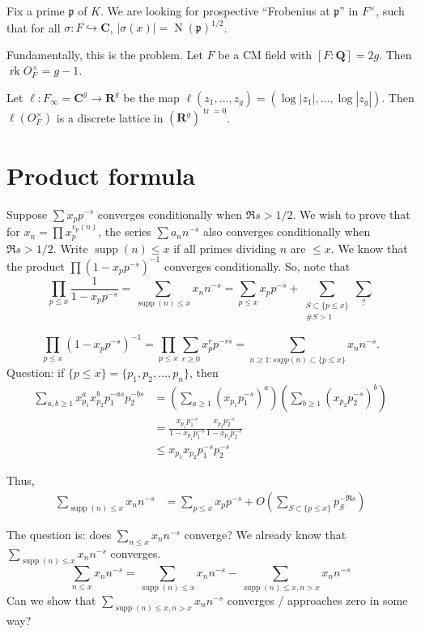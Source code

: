 \documentclass{article}
\DeclareMathOperator{\N}{N}
\DeclareMathOperator{\rk}{rk}
\DeclareMathOperator{\supp}{supp}
\DeclareMathOperator{\tr}{tr}
\newcommand{\bC}{\mathbf{C}}
\newcommand{\bQ}{\mathbf{Q}}
\newcommand{\bR}{\mathbf{R}}
\newcommand{\fp}{\mathfrak{p}}
\begin{document}
Fix a prime $\fp$ of $K$. We are looking for prospective ``Frobenius at $\fp$'' 
in $F^\times$, such that for all $\sigma\colon F\hookrightarrow\bC$, 
$|\sigma(x)| = \N(\fp)^{1/2}$. 

Fundamentally, this is the problem. Let $F$ be a CM field with 
$[F:\bQ] = 2 g$. Then $\rk O_F^\times = g - 1$. 


Let $\ell\colon F_\infty = \bC^g \to \bR^g$ be the map 
$\ell(z_1,\dots,z_g) = (\log |z_1|,\dots,\log |z_g|)$. Then 
$\ell(O_F^\times)$ is a discrete lattice in $(\bR^g)^{\tr = 0}$. 





\section{Product formula}

Suppose $\sum x_p p^{-s}$ converges conditionally when $\Re s > 1/2$. We wish 
to prove that for $x_n = \prod x_p^{v_p(n)}$, the series $\sum a_n n^{-s}$ also 
converges conditionally when $\Re s>1/2$. Write $\supp(n)\leqslant x$ if all 
primes dividing $n$ are $\leqslant x$. We know that the product 
$\prod (1 - x_p p^{-s})^{-1}$ converges conditionally. So, note that 
\[
	\prod_{p\leqslant x} \frac{1}{1 - x_p p^{-s}} = \sum_{\supp(n)\leqslant x} x_n n^{-s} = \sum_{p\leqslant x} x_p p^{-s} + \sum_{\substack{S\subset \{p\leqslant x\} \\ \# S > 1}} \sum_?
\]

\[
	\prod_{p\leqslant x} (1 - x_p p^{-s})^{-1} = \prod_{p\leqslant x} \sum_{r\geqslant 0} x_p^r p^{-r s} = \sum_{n\geqslant 1 : supp(n) \subset \{p\leqslant x\}} x_n n^{-s} .
\]
Question: if $\{p\leqslant x\} = \{p_1,p_2,\dots,p_n\}$, then 
\begin{align*}
	\sum_{a,b\geqslant 1} x_{p_1}^a x_{p_2}^b p_1^{-a s} p_2^{-b s} 
		&= \left(\sum_{a\geqslant 1} (x_{p_1} p_1^{-s})^a\right)\left(\sum_{b\geqslant 1} (x_{p_2} p_2^{-s})^b\right) \\
		&= \frac{x_{p_1} p_1^{-s}}{1 - x_{p_1} p_1^{-s}} \frac{x_{p_2} p_2^{-s}}{1 - x_{p_2} p_2^{-s}} \\
		&\leqslant x_{p_1} x_{p_2} p_1^{-s} p_2^{-s}
\end{align*}

Thus, 
\begin{align*}
	\sum_{\supp(n)\leqslant x} x_n n^{-s} 
		&= \sum_{p\leqslant x} x_p p^{-s} + O\left(\sum_{S\subset \{p\leqslant x\}} p_S^{-\Re s}\right)
\end{align*}


The question is: does $\sum_{n\leqslant x} x_n n^{-s}$ converge? We already 
know that $\sum_{\supp(n)\leqslant x} x_n n^{-s}$ converges. 
\[
	\sum_{n\leqslant x} x_n n^{-s} = \sum_{\supp(n) \leqslant x} x_n n^{-s} - \sum_{\supp(n) \leqslant x, n > x} x_n n^{-s}
\]
Can we show that $\sum_{\supp(n) \leqslant x, n>x} x_n n^{-s}$ converges / 
approaches zero in some way?
\end{document}
